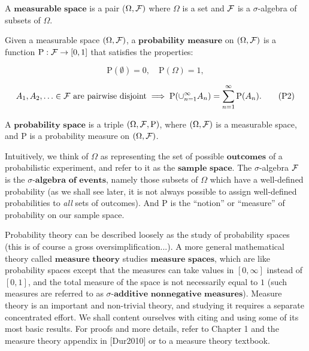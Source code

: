 \begin{defn}
A $\textbf{measurable space}$ is a pair
($\Omega,{\cal F})$ where $\Omega$ is a set and
${\cal F}$ is a $\sigma$-algebra of subsets of
$\Omega$.
\end{defn}

\begin{defn}
Given a measurable space $(\Omega, {\cal F})$, a
$\textbf{probability measure}$ on $(\Omega, {\cal F})$
is a function $\mathrm{P}:{\cal F}\to[0,1]$ that
satisfies the properties:

\begin{equation*}
\mathrm{P}(\emptyset) = 0, \quad \mathrm{P}(\Omega) = 1,
\tag{P1}
\end{equation*}

\begin{equation*}
A_1, A_2, \ldots \in {\cal F}\textrm{ are pairwise disjoint} \implies
\mathrm{P}(\cup_{n=1}^\infty A_n) = \sum_{n=1}^\infty \mathrm{P}(A_n).
\tag{P2}
\end{equation*}

\end{defn}

\begin{defn}
A $\textbf{probability space}$ is a triple
$(\Omega, {\cal F}, \mathrm{P})$, where
$(\Omega, {\cal F})$ is a measurable space, and
$\mathrm{P}$ is a probability measure on
$(\Omega, {\cal F})$.
\end{defn}

\noindent Intuitively, we think of $\Omega$ as representing the
set of possible $\textbf{outcomes}$ of a
probabilistic experiment, and refer to it as the
$\textbf{sample space}$. The $\sigma$-algebra
${\cal F}$ is the $\textbf{$\sigma
$-algebra of events}$, namely those subsets of
$\Omega$ which have a well-defined probability (as we
shall see later, it is not always possible to assign
well-defined probabilities to \emph{all} sets of outcomes).
And $\mathrm{P}$ is the ``notion'' or ``measure'' of
probability on our sample space.

Probability theory can be described loosely as the
study of probability spaces (this is of course a gross
oversimplification...). A more general mathematical
theory called $\textbf{measure theory}$ studies
$\textbf{measure spaces}$, which are like probability
spaces except that the measures can take values in
$[0,\infty]$ instead of $[0,1]$, and the total
measure of the space is not necessarily equal to $1$
(such measures are referred to as $\textbf{$\sigma
$-additive nonnegative measures}$). Measure theory is
an important and non-trivial theory, and studying it
requires a separate concentrated effort. We shall
content ourselves with citing and using some of its
most basic results. For proofs and more details, refer
to Chapter 1 and the measure theory appendix in
[Dur2010] or to a measure theory textbook.

